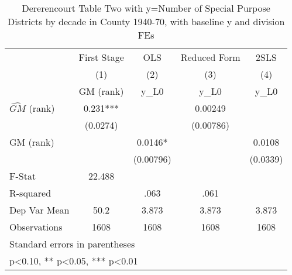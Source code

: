 \begin{table}[htbp]\centering
\def\sym#1{\ifmmode^{#1}\else\(^{#1}\)\fi}
\caption{Dererencourt Table Two with y=Number of Special Purpose Districts by decade in County 1940-70, with baseline y and division FEs}
\begin{tabular}{l*{4}{c}}
\toprule
                    & First Stage   &         OLS   &Reduced Form   &        2SLS   \\
                    &\multicolumn{1}{c}{(1)}&\multicolumn{1}{c}{(2)}&\multicolumn{1}{c}{(3)}&\multicolumn{1}{c}{(4)}\\
                    &\multicolumn{1}{c}{GM  (rank)}&\multicolumn{1}{c}{y\_L0}&\multicolumn{1}{c}{y\_L0}&\multicolumn{1}{c}{y\_L0}\\
\midrule
$\hat{GM}$ (rank)   &       0.231***&               &     0.00249   &               \\
                    &    (0.0274)   &               &   (0.00786)   &               \\
\addlinespace
GM  (rank)          &               &      0.0146*  &               &      0.0108   \\
                    &               &   (0.00796)   &               &    (0.0339)   \\
\midrule
F-Stat              &      22.488   &               &               &               \\
R-squared           &               &        .063   &        .061   &               \\
Dep Var Mean        &        50.2   &       3.873   &       3.873   &       3.873   \\
Observations        &        1608   &        1608   &        1608   &        1608   \\
\bottomrule
\multicolumn{5}{l}{\footnotesize Standard errors in parentheses}\\
\multicolumn{5}{l}{\footnotesize * p<0.10, ** p<0.05, *** p<0.01}\\
\end{tabular}
\end{table}
